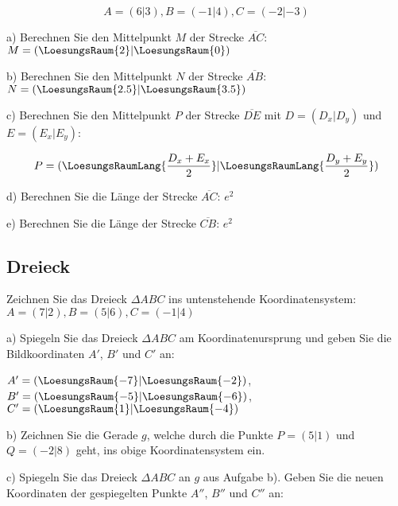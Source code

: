 $$A=(6|3), B=(-1|4), C=(-2|-3)$$


a) Berechnen Sie den Mittelpunkt $M$ der Strecke $\overline{AC}$: $M=(\LoesungsRaum{2}|\LoesungsRaum{0})$


b) Berechnen Sie den Mittelpunkt $N$ der Strecke $\overline{AB}$: $N=(\LoesungsRaum{2.5}|\LoesungsRaum{3.5})$


c) Berechnen Sie den Mittelpunkt $P$ der Strecke $\overline{DE}$ mit
$D=(D_x|D_y)$ und $E=(E_x|E_y)$:


$$P = (\LoesungsRaumLang{\frac{D_x+E_x}2}|\LoesungsRaumLang{\frac{D_y+E_y}2})$$

d) Berechnen Sie die Länge der Strecke $\overline{AC}$: $e^2$


e) Berechnen Sie die Länge der Strecke $\overline{CB}$: $e^2$
\newpage%
\subsection{Dreieck}
Zeichnen Sie das Dreieck $\Delta{}ABC$ ins untenstehende
Koordinatensystem:\\
$A=(7|2), B=(5|6), C=(-1|4)$


a) Spiegeln Sie das Dreieck $\Delta ABC$ am Koordinatenursprung und
geben Sie die Bildkoordinaten $A'$, $B'$ und $C'$ an:

$A' = (\LoesungsRaum{-7}|\LoesungsRaum{-2})$, 
$B' = (\LoesungsRaum{-5}|\LoesungsRaum{-6})$,\\
$C' = (\LoesungsRaum{1}|\LoesungsRaum{-4})$

b) Zeichnen Sie die Gerade $g$, welche durch die Punkte $P=(5|1)$ und
$Q=(-2|8)$ geht, ins obige Koordinatensystem ein.

c) Spiegeln Sie das Dreieck $\Delta ABC$ an $g$ aus Aufgabe b). Geben
Sie die neuen Koordinaten der gespiegelten Punkte $A''$, $B''$ und
$C''$ an:


